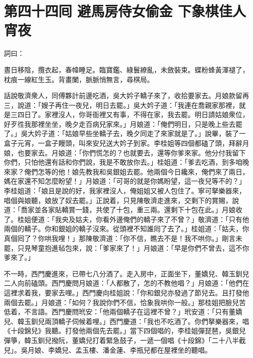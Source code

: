 
\chapter*{第四十四囘 避馬房侍女偷金 下象棋佳人宵夜}


詞曰：

\begin{myquote}
晝日移陰，攬衣起，春幃睡足。臨寶鑑、綠鬟繚亂，未斂裝束。蝶粉蜂黃渾褪了，枕痕一線紅生玉。背畫闌，脈脈悄無言，尋棋局。

\end{myquote}

話說敬濟衆人，同傅夥計前邊吃酒，吳大妗子轎子來了，收拾要家去。月娘款留再三，說道：「嫂子再住一夜兒，明日去罷。」吳大妗子道：「我連在喬親家那裡，就是三四日了。家裡沒人，你哥衙裡又有事，不得在家，我去罷。明日請姑娘衆位，好歹徃我那裡坐坐，晚夕走百病兒家來。」月娘道：「俺們明日，只是晚上些去罷了。」吳大妗子道：「姑娘早些坐轎子去，晚夕同走了來家就是了。」說畢，裝了一盒子元宵，一盒子饅頭，叫來安兒送大妗子到家。李桂姐等四個都磕了頭，拜辭月娘，也要家去。月娘道：「你們慌怎的？也就要去，還等你爹來家。他分付我留下你們，只怕他還有話和你們說，我是不敢放你去。」桂姐道：「爹去吃酒，到多咱晚來家？俺們怎等的他！娘先教我和吳銀姐去罷。他兩個今日纔來，俺們來了兩日，媽在家還不知怎麼盼望！」月娘道：「可哥的就是你媽盼望，這一夜兒等不的？」李桂姐道：「娘且是說的好，我家裡沒人，俺姐姐又被人包住了。寧可拏樂器來，唱個與娘聽，娘放了奴去罷。」正說着，只見陳敬濟走進來，交剩下的賞賜，說道：「喬家並各家貼轎賞一錢，共使了十包，重三兩。還剩下十包在此。」月娘收了。桂姐便道：「我央及姑夫，你看外邊俺們的轎子來了不曾？」敬濟道：「只有他兩個的轎子。你和銀姐的轎子沒來。從頭裡不知誰囘了去了。」桂姐道：「姑夫，你真個囘了？你哄我哩！」那陳敬濟道：「你不信，瞧去不是！我不哄你。」剛言未罷，只見琴童抱進毡包來，說：「爹家來了！」月娘道：「早是你們不曾去，這不你爹來了。」

不一時，西門慶進來，已帶七八分酒了。走入房中，正面坐下，董嬌兒、韓玉釧兒二人向前磕頭。西門慶問月娘道：「人都散了，怎的不教他唱？」月娘道：「他們在這裡求着我，要家去哩。」西門慶向桂姐說：「你和銀兒亦發過了節兒去。且打發他兩個去罷。」月娘道：「如何？我說你們不信，恰象我哄你一般。」那桂姐把臉兒苦低着，不言語。{}西門慶問玳安：「他兩個轎子在這裡不曾？」玳安道：「只有董嬌兒、韓玉釧兒兩頂轎子伺候着哩。」西門慶道：「我也不吃酒了。你們拏樂器來，唱《十段錦兒》我聽。打發他兩個先去罷。」當下四個唱的，李桂姐彈琵琶，吳銀兒彈箏，韓玉釧兒撥阮，董嬌兒打着緊急鼓子，一遞一個唱《十段錦》「二十八半截兒」。吳月娘、李嬌兒、孟玉樓、潘金蓮、李瓶兒都在屋裡坐的聽唱。

